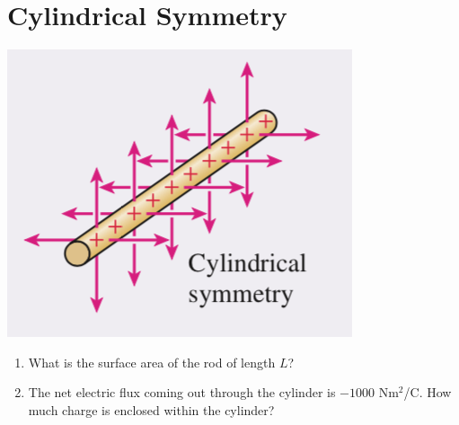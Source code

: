 \documentclass[11pt]{article}
\begin{document}
\section{Cylindrical Symmetry}
\begin{center}
\includegraphics[width=.3\linewidth]{W2b_fig1}
\end{center}
\begin{enumerate}[label=(\alph*)]
	\item What is the surface area of the rod of length $L$?
	\item The net electric flux coming out through the cylinder is $-1000$ Nm$^2$/C. How much charge is enclosed   within the cylinder?
\end{enumerate}
\end{document}
